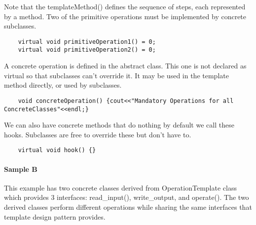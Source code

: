 \documentclass{book}
\begin{document}
    Note that the templateMethod() defines the sequence of steps, each represented by a method.
    Two of the primitive operations must be implemented by concrete subclasses.

\begin{verbatim}
    virtual void primitiveOperation1() = 0;
    virtual void primitiveOperation2() = 0;
\end{verbatim}

    A concrete operation is defined in the abstract class.
    This one is not declared as virtual so that subclasses can't override it. It may be used in the template method directly, or used by subclasses.

\begin{verbatim}
    void concreteOperation() {cout<<"Mandatory Operations for all ConcreteClasses"<<endl;}
\end{verbatim}
    We can also have concrete methods that do nothing by default we call these hooks. Subclasses are free to override these but don't have to.

\begin{verbatim}
    virtual void hook() {}
\end{verbatim}


\paragraph{Sample B}
This example has two concrete classes derived from OperationTemplate class which provides 3 interfaces: read\_input(), write\_output, and operate().
The two derived classes perform different operations while sharing the same interfaces that template design pattern provides.
\end{document}
